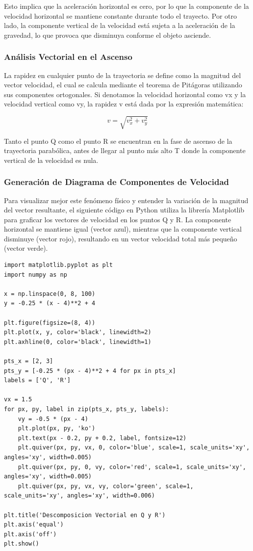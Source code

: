 \documentclass[12pt, a4paper]{article}
\begin{document}
Esto implica que la aceleración horizontal es cero, por lo que la componente de la velocidad horizontal se mantiene constante durante todo el trayecto. Por otro lado, la componente vertical de la velocidad está sujeta a la aceleración de la gravedad, lo que provoca que disminuya conforme el objeto asciende.

\subsubsection*{Análisis Vectorial en el Ascenso}

La rapidez en cualquier punto de la trayectoria se define como la magnitud del vector velocidad, el cual se calcula mediante el teorema de Pitágoras utilizando sus componentes ortogonales. Si denotamos la velocidad horizontal como vx y la velocidad vertical como vy, la rapidez v está dada por la expresión matemática:

\begin{equation}
v = \sqrt{v_x^2 + v_y^2}
\end{equation}

Tanto el punto Q como el punto R se encuentran en la fase de ascenso de la trayectoria parabólica, antes de llegar al punto más alto T donde la componente vertical de la velocidad es nula. 

\subsubsection*{Generación de Diagrama de Componentes de Velocidad}

Para visualizar mejor este fenómeno físico y entender la variación de la magnitud del vector resultante, el siguiente código en Python utiliza la librería Matplotlib para graficar los vectores de velocidad en los puntos Q y R. La componente horizontal se mantiene igual (vector azul), mientras que la componente vertical disminuye (vector rojo), resultando en un vector velocidad total más pequeño (vector verde).

\begin{lstlisting}
import matplotlib.pyplot as plt
import numpy as np

x = np.linspace(0, 8, 100)
y = -0.25 * (x - 4)**2 + 4

plt.figure(figsize=(8, 4))
plt.plot(x, y, color='black', linewidth=2)
plt.axhline(0, color='black', linewidth=1)

pts_x = [2, 3]
pts_y = [-0.25 * (px - 4)**2 + 4 for px in pts_x]
labels = ['Q', 'R']

vx = 1.5
for px, py, label in zip(pts_x, pts_y, labels):
    vy = -0.5 * (px - 4)
    plt.plot(px, py, 'ko')
    plt.text(px - 0.2, py + 0.2, label, fontsize=12)
    plt.quiver(px, py, vx, 0, color='blue', scale=1, scale_units='xy', angles='xy', width=0.005)
    plt.quiver(px, py, 0, vy, color='red', scale=1, scale_units='xy', angles='xy', width=0.005)
    plt.quiver(px, py, vx, vy, color='green', scale=1, scale_units='xy', angles='xy', width=0.006)

plt.title('Descomposicion Vectorial en Q y R')
plt.axis('equal')
plt.axis('off')
plt.show()
\end{lstlisting}
\end{document}
